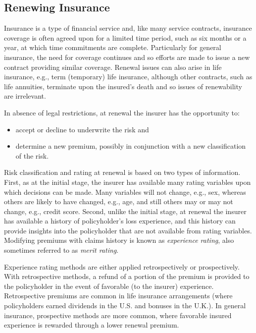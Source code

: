 \documentclass[]{book}
\begin{document}
\subsection{Renewing Insurance}\label{renewing-insurance}

Insurance is a type of financial service and, like many service
contracts, insurance coverage is often agreed upon for a limited time
period, such as six months or a year, at which time commitments are
complete. Particularly for general insurance, the need for coverage
continues and so efforts are made to issue a new contract providing
similar coverage. Renewal issues can also arise in life insurance, e.g.,
term (temporary) life insurance, although other contracts, such as life
annuities, terminate upon the insured's death and so issues of
renewability are irrelevant.

In absence of legal restrictions, at renewal the insurer has the
opportunity to:

\begin{itemize}
\item
  accept or decline to underwrite the risk and
\item
  determine a new premium, possibly in conjunction with a new
  classification of the risk.
\end{itemize}

Risk classification and rating at renewal is based on two types of
information. First, as at the initial stage, the insurer has available
many rating variables upon which decisions can be made. Many variables
will not change, e.g., sex, whereas others are likely to have changed,
e.g., age, and still others may or may not change, e.g., credit score.
Second, unlike the initial stage, at renewal the insurer has available a
history of policyholder's loss experience, and this history can provide
insights into the policyholder that are not available from rating
variables. Modifying premiums with claims history is known as
\emph{experience rating}, also sometimes referred to as \emph{merit
rating}.

Experience rating methods are either applied retrospectively or
prospectively. With retrospective methods, a refund of a portion of the
premium is provided to the policyholder in the event of favorable (to
the insurer) experience. Retrospective premiums are common in life
insurance arrangements (where policyholders earned dividends in the U.S.
and bonuses in the U.K.). In general insurance, prospective methods are
more common, where favorable insured experience is rewarded through a
lower renewal premium.
\end{document}
